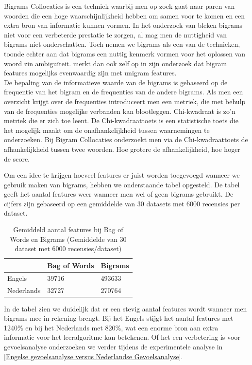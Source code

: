 Bigrams Collocaties is een techniek waarbij men op zoek gaat naar paren van woorden die een hoge waarschijnlijkheid hebben om samen voor te komen en een extra bron van informatie kunnen vormen. In het onderzoek van \cite{pang2002thumbs} bleken bigrams niet voor een verbeterde prestatie te zorgen, al mag men de nuttigheid van bigrams niet onderschatten. Toch nemen we bigrams als een van de technieken,\cite{edersen2001decision} toonde echter aan dat bigrams een nuttig kenmerk vormen voor het oplossen van woord zin ambigu\"iteit. \cite{pang2002thumbs} merkt dan ook zelf op in zijn onderzoek dat bigram features mogelijks evenwaardig zijn met unigram features.\\
%
De bepaling van de informatieve waarde van de bigrams is gebaseerd op de frequentie van het bigram en de frequenties van de andere bigrams. Als men een overzicht krijgt over de frequenties introduceert men een metriek, die met behulp van de frequenties mogelijke verbanden kan blootleggen. Chi-kwadraat is zo'n metriek die er zich toe leent. De Chi-kwadraattoets is een statistische toets die het mogelijk maakt om de onafhankelijkheid tussen waarnemingen te onderzoeken. Bij Bigram Collocaties onderzoekt men via de Chi-kwadraattoets de afhankelijkheid tussen twee woorden. Hoe grotere de afhankelijkheid, hoe hoger de score. 

Om een idee te krijgen hoeveel features er juist worden toegevoegd wanneer we gebruik maken van bigrams, hebben we onderstaande tabel opgesteld. De tabel geeft het aantal features weer wanneer men wel of geen bigrams gebruikt. De cijfers zijn gebaseerd op een gemiddelde van 30 datasets met 6000 recensies per dataset.

\begin{table}[h]
\centering
\begin{tabular}{l|l|l|}
\cline{2-3}
                                 & Bag of Words & Bigrams \\ \hline
\multicolumn{1}{|l|}{Engels}     & 39716        & 493633  \\ \hline
\multicolumn{1}{|l|}{Nederlands} & 32727        & 270764  \\ \hline
\end{tabular}
\caption{Gemiddeld aantal features bij Bag of Words en Bigrams (Gemiddelde van 30 dataset met 6000 recensies/dataset)}
\end{table}

In de tabel zien we duidelijk dat er een stevig aantal features wordt wanneer men bigrams mee in rekening brengt. Bij het Engels stijgt het aantal features met 1240\% en bij het Nederlands met 820\%, wat een enorme bron aan extra informatie voor het leeralgoritme kan betekenen. Of het een verbetering is voor gevoelsanalyse onderzoeken we verder tijdens de experimentele analyse in \ref{Engelse gevoelsanalyse versus Nederlandse Gevoelsanalyse}.

